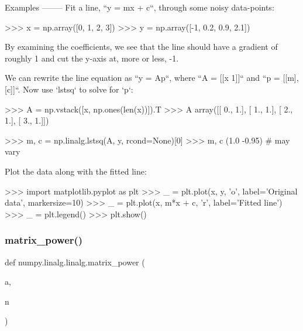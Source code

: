 \begin{DoxyVerb}
Examples
--------
Fit a line, ``y = mx + c``, through some noisy data-points:

>>> x = np.array([0, 1, 2, 3])
>>> y = np.array([-1, 0.2, 0.9, 2.1])

By examining the coefficients, we see that the line should have a
gradient of roughly 1 and cut the y-axis at, more or less, -1.

We can rewrite the line equation as ``y = Ap``, where ``A = [[x 1]]``
and ``p = [[m], [c]]``.  Now use `lstsq` to solve for `p`:

>>> A = np.vstack([x, np.ones(len(x))]).T
>>> A
array([[ 0.,  1.],
       [ 1.,  1.],
       [ 2.,  1.],
       [ 3.,  1.]])

>>> m, c = np.linalg.lstsq(A, y, rcond=None)[0]
>>> m, c
(1.0 -0.95) # may vary

Plot the data along with the fitted line:

>>> import matplotlib.pyplot as plt
>>> _ = plt.plot(x, y, 'o', label='Original data', markersize=10)
>>> _ = plt.plot(x, m*x + c, 'r', label='Fitted line')
>>> _ = plt.legend()
>>> plt.show()\end{DoxyVerb}
 \mbox{\label{namespacenumpy_1_1linalg_1_1linalg_a08232cc1aa29123f9564a18e6392a335}} 
\subsubsection{\texorpdfstring{matrix\+\_\+power()}{matrix\_power()}}
{\footnotesize\ttfamily def numpy.\+linalg.\+linalg.\+matrix\+\_\+power (\begin{DoxyParamCaption}\item[{}]{a,  }\item[{}]{n }\end{DoxyParamCaption})}

